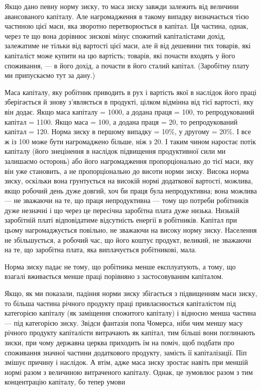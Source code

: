 
Якщо дано певну норму зиску, то маса зиску завжди залежить
від величини авансованого капіталу. Але нагромадження
в такому випадку визначається тією частиною цієї маси, яка
зворотно перетворюється в капітал. Ця частина, однак, через
те що вона дорівнює зискові мінус спожитий капіталістами дохід,
залежатиме не тільки від вартості цієї маси, але й від дешевини
тих товарів, які капіталіст може купити на цю вартість;
товарів, які почасти входять у його споживання, — в його дохід,
а почасти в його сталий капітал. (Заробітну плату ми припускаємо
тут за дану.)

Маса капіталу, яку робітник приводить в рух і вартість якої
в наслідок його праці зберігається й знову з’являється в продукті,
цілком відмінна від тієї вартості, яку він додає. Якщо
маса капіталу = 1000, а додана праця = 100, то репродукований
капітал = 1100. Якщо маса = 100, а додана праця = 20, то
репродукований капітал = 120. Норма зиску в першому випадку
= 10\%, у другому = 20\%. І все ж із 100 може бути
нагромаджено більше, ніж з 20. І таким чином наростає потік
капіталу (його знецінення в наслідок підвищення продуктивної
сили ми залишаємо осторонь) або його нагромадження
пропорціонально до тієї маси, яку він уже становить, а не
пропорціонально до висоти норми зиску. Висока норма зиску,
оскільки вона грунтується на високій нормі додаткової вартості,
можлива, якщо робочий день дуже довгий, хоч би
праця була непродуктивна; вона можлива — не зважаючи на
те, що праця непродуктивна — тому що потреби робітників
дуже незначні і що через це пересічна заробітна плата дуже
низька. Низькій заробітній платі відповідатиме відсутність енергії
в робітників. Капітал при цьому нагромаджується повільно,
не зважаючи на високу норму зиску. Населення не збільшується,
а робочий час, що його коштує продукт, великий, не зважаючи
на те, що заробітна плата, яка виплачується робітникові,
мала.

Норма зиску падає не тому, що робітника менше експлуатують,
а тому, що взагалі вживається менше праці порівняно
з застосовуваним капіталом.

Якщо, як ми показали, падіння норми зиску збігається з підвищенням
маси зиску, то більша частина річного продукту праці
привласнюється капіталістом під категорією капіталу (як заміщення
спожитого капіталу) і відносно менша частина — під категорією
зиску. Звідси фантазія попа Чомерса, ніби чим меншу масу річного
продукту капіталісти витрачають як капітал, тим більші
вони поглинають зиски, при чому державна церква приходить
їм на поміч, щоб подбати про споживання значної частини додаткового
продукту, замість її капіталізації. Піп змішує причину
і наслідок. А втім, адже маса зиску зростає навіть при меншій
нормі разом з величиною витраченого капіталу. Однак, це зумовлює
разом з тим концентрацію капіталу, бо тепер умови
\parbreak{}  %
